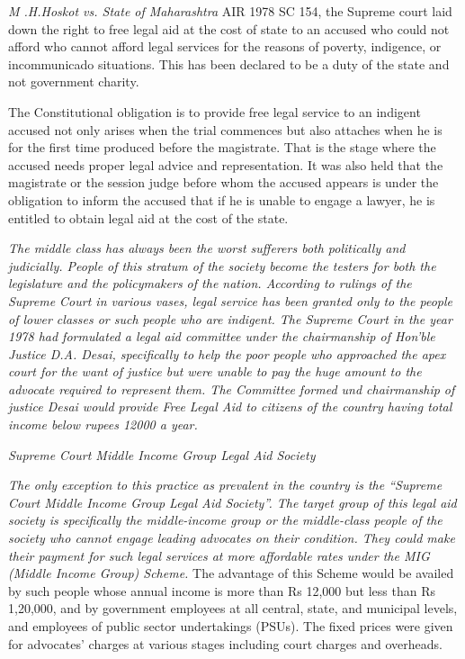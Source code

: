 \begin{multicols}{2}
\noi
\textit{M .H.Hoskot vs. State of Maharashtra} AIR 1978 SC 154, the Supreme court laid down the right to free legal aid at the cost of state to an accused who could not afford who cannot afford legal services for the reasons of poverty, indigence, or incommunicado situations. This has been declared to be a duty of the state and not government charity.

\noi
The Constitutional obligation is to provide free legal service to an indigent accused not only arises when the trial commences but also attaches when he is for the first time produced before the magistrate. That is the stage where the accused needs proper legal advice and representation. It was also held that the magistrate or the session judge before whom the accused appears is under the obligation to inform the accused that if he is unable to engage a lawyer, he is entitled to obtain legal aid at the cost of the state.


\noi
\textit{The middle class has always been the worst sufferers both politically and judicially. People of this stratum of the society become the testers for both the legislature and the policymakers of the nation. According to rulings of the Supreme Court in various vases, legal service has been granted only to the people of lower classes or such people who are indigent. The Supreme Court in the year 1978 had formulated a legal aid committee under the chairmanship of Hon’ble Justice D.A. Desai, specifically to help the poor people who approached the apex court for the want of justice but were unable to pay the huge amount to the advocate required to represent them. The Committee formed und chairmanship of justice Desai would provide Free Legal Aid to citizens of the country having total income below rupees 12000 a year.}

\noi
\textit{Supreme Court Middle Income Group Legal Aid Society}

\noi
\textit{The only exception to this practice as prevalent in the country is the “Supreme Court Middle Income Group Legal Aid Society”. The target group of this legal aid society is specifically the middle-income group or the middle-class people of the society who cannot engage leading advocates on their condition. They could make their payment for such legal services at more affordable rates under the MIG (Middle Income Group) Scheme.} The advantage of this Scheme would be availed by such people whose annual income is more than Rs 12,000 but less than Rs 1,20,000, and by government employees at all central, state, and municipal levels, and employees of public sector undertakings (PSUs). The fixed prices were given for advocates’ charges at various stages including court charges and overheads.


\end{multicols}
